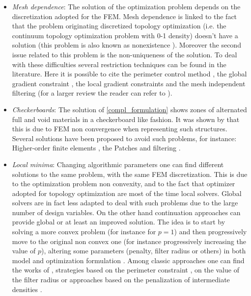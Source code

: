 \begin{itemize}
\item \textit{Mesh dependence}: The solution of the optimization problem depends on the discretization adopted for the FEM. Mesh dependence is linked to the fact that the problem originating discretized  topology optimization (i.e. the continuum topology optimization problem with 0-1 density) doesn't have a solution (this problem is also known as nonexistence \cite{sigmund1998numerical}). Moreover the second issue related to this problem is the non-uniqueness of the solution. To deal with these difficulties several restriction techniques can be found in the literature. Here it is possible to cite the perimeter control method \cite{ambrosio1993optimal,haber1996new}, the global gradient constraint \cite{bendsoe1995optimization}, the local gradient constraints \cite{niordson1983optimal} and the mesh independent filtering \cite{sigmund1994design,sigmund1997design} (for a larger review the reader can refer to \cite{sigmund2007morphology}).
\item \textit{Checkerboards}: The solution of \ref{compl_formulation} shows zones of alternated full and void materials in a checkerboard like fashion. It was shown by \cite{jog1996stability}  that this is due to FEM non convergence when representing such structures.
Several solutions have been proposed to avoid such problems, for instance:
Higher-order finite elements \cite{diaz1995checkerboard,jog1996stability}, the Patches \cite{bendsoe1993topology} and filtering \cite{sigmund1994design}. 
\item \textit{Local minima}: Changing algorithmic parameters one can find different solutions to the same problem, with the same FEM discretization. This is due to the optimization problem non convexity, and to the fact that optimizer adopted for topology optimization are most of the time local solvers. Global solvers are in fact less adapted to deal with such problems due to the large number of design variables. On the other hand continuation approaches can provide global or at least an improved solution. The idea is to start by solving a more convex problem (for instance for $p=1$) and then progressively move to the original non convex one (for instance progressively increasing the value of $p$), altering some parameters (penalty, filter radius or others) in both model and optimization formulation . Among classic approaches one can find the works of
\cite{allaire1993numerical,allaire1993topology}, strategies based on the perimeter constraint \cite{haber1996new}, on the value of the filter radius \cite{sigmund1997design,sigmund1997designb} or approaches based on the penalization of intermediate densities \cite{guedes1997prediction} .
\end{itemize}
